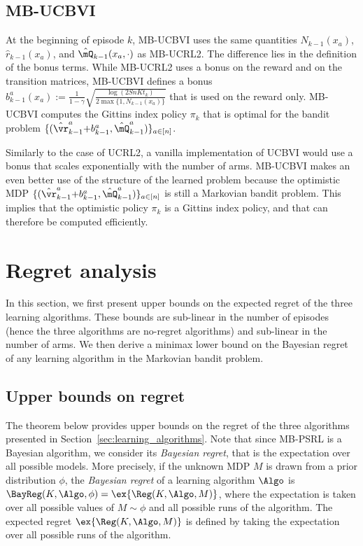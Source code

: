 \subsection{MB-UCBVI}
At the beginning of episode $k$, MB-UCBVI uses the same quantities $N_{k-1}(x_a)$, $\hat{r}_{k-1}(x_a)$, and $\hat{\mQ}_{k-1}(x_a,\cdot)$ as MB-UCRL2. The difference lies in the definition of the bonus terms. While MB-UCRL2 uses a bonus on the reward and on the transition matrices, MB-UCBVI defines a bonus $b_{k-1}^a(x_a){:=}\frac{1}{1-\gamma}\sqrt{\frac{\log(2SnKt_k)}{2\max\{1,N_{k-1}(x_a)\}}}$ that is used on the reward only. MB-UCBVI computes the Gittins index policy $\pi_k$ that is optimal for the bandit problem $\{(\hat{\vr}_{k-1}^a {+}b_{k-1}^a, \hat{\mQ}_{k-1}^a)\}_{a\in[n]}$. 

Similarly to the case of UCRL2, a vanilla implementation of UCBVI would use a bonus that scales exponentially with the number of arms. MB-UCBVI makes an even  better use of the structure of the learned problem because the optimistic MDP $\{(\hat{\vr}_{k-1}^a {+}b_{k-1}^a, \hat{\mQ}_{k-1}^a)\}_{a\in[n]}$ is still a Markovian bandit problem. This implies that the optimistic policy $\pi_k$ is a Gittins index policy, and that can therefore be computed efficiently.

\section{Regret analysis}
\label{sec:analysis}

In this section, we first present upper bounds on the expected regret of the three learning algorithms.  These bounds are sub-linear in the number of episodes (hence the three algorithms are no-regret algorithms) and sub-linear in the number of arms. We then derive a minimax lower bound on the Bayesian regret of any learning algorithm in the Markovian bandit problem. 

\subsection{Upper bounds on regret}
\label{ssec:upper_bound_psrl}

The theorem below provides upper bounds on the regret of the three algorithms presented in Section~\ref{sec:learning_algorithms}. Note that since MB-PSRL is a Bayesian algorithm, we consider its \emph{Bayesian regret}, that is the expectation over all possible models. More precisely, if the unknown MDP $M$ is drawn from a prior distribution $\phi$, the \textit{Bayesian regret} of a learning algorithm $\Algo$ is $\BayReg(K,\Algo,\phi) = \ex{\Reg(K,\Algo,M)}$, where the expectation is taken over all possible values of $M \sim \phi$ and all possible runs of the algorithm. The expected regret $\ex{\Reg(K,\Algo,M)}$ is defined by taking the expectation over all possible runs of the algorithm.

